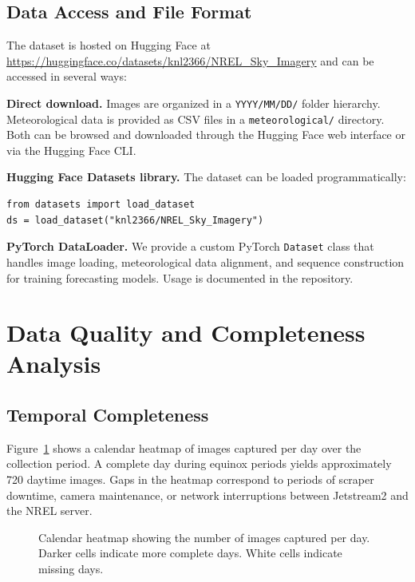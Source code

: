 \documentclass[twoside,11pt]{article}
\begin{document}
\subsection{Data Access and File Format}

The dataset is hosted on Hugging Face at \url{https://huggingface.co/datasets/knl2366/NREL_Sky_Imagery} and can be accessed in several ways:

\textbf{Direct download.} Images are organized in a \texttt{YYYY/MM/DD/} folder hierarchy. Meteorological data is provided as CSV files in a \texttt{meteorological/} directory. Both can be browsed and downloaded through the Hugging Face web interface or via the Hugging Face CLI.

\textbf{Hugging Face Datasets library.} The dataset can be loaded programmatically:
\begin{lstlisting}
from datasets import load_dataset
ds = load_dataset("knl2366/NREL_Sky_Imagery")
\end{lstlisting}

\textbf{PyTorch DataLoader.} We provide a custom PyTorch \texttt{Dataset} class that handles image loading, meteorological data alignment, and sequence construction for training forecasting models. Usage is documented in the repository.

\section{Data Quality and Completeness Analysis}
\label{sec:quality}

\subsection{Temporal Completeness}

Figure~\ref{fig:heatmap} shows a calendar heatmap of images captured per day over the collection period. A complete day during equinox periods yields approximately 720 daytime images. Gaps in the heatmap correspond to periods of scraper downtime, camera maintenance, or network interruptions between Jetstream2 and the NREL server.

\begin{figure}[t]
    \centering
    \caption{Calendar heatmap showing the number of images captured per day. Darker cells indicate more complete days. White cells indicate missing days.}
    \label{fig:heatmap}
\end{figure}
\end{document}
